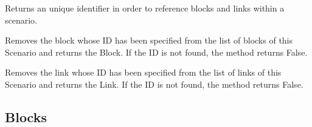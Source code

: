 \documentclass[letterpaper,10pt,english]{sphinxmanual}
\begin{document}
\begin{fulllineitems}
\begin{fulllineitems}
\end{fulllineitems}


\begin{fulllineitems}
\label{api/scenario:scenario.Scenario.get_new_id}
Returns an unique identifier in order to reference
blocks and links within a scenario.

\end{fulllineitems}


\begin{fulllineitems}
\label{api/scenario:scenario.Scenario.remove_block}
Removes the block whose ID has been specified from
the list of blocks of this Scenario and returns the Block.
If the ID is not found, the method returns False.

\end{fulllineitems}


\begin{fulllineitems}
\label{api/scenario:scenario.Scenario.remove_link}
Removes the link whose ID has been specified from
the list of links of this Scenario and returns the Link.
If the ID is not found, the method returns False.

\end{fulllineitems}


\end{fulllineitems}



\subsection{Blocks}
\label{api/scenario:blocks}

\begin{fulllineitems}
\label{api/scenario:scenario.Block}
\end{fulllineitems}


\begin{fulllineitems}
\label{api/scenario:scenario.SimpleBlock}
\end{fulllineitems}
\end{document}
